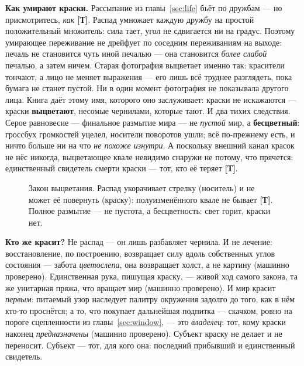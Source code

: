 \documentclass[11pt,letterpaper]{article}
\newcommand{\stT}{\textbf{[Т]}\xspace}
\begin{document}
\textbf{Как умирают краски.} Рассыпание из главы~\ref{sec:life}
бьёт по дружбам --- но присмотритесь, \emph{как} \stT. Распад
умножает каждую дружбу на простой положительный множитель: сила
тает, угол не сдвигается ни на градус. Поэтому умирающее
переживание не дрейфует по соседним переживаниям на выходе: печаль
не становится чуть иной печалью --- она становится \emph{более
слабой} печалью, а затем ничем. Старая фотография выцветает именно
так: красители тончают, а лицо не меняет выражения --- его лишь всё
труднее разглядеть, пока бумага не станет пустой. Ни в один момент
фотография не показывала другого лица. Книга даёт этому имя,
которого оно заслуживает: краски не искажаются --- краски
\textbf{выцветают}, несомые чернилами, которые тают. И два тихих
следствия. Серое равновесие --- финальное размытие мира --- не
\emph{пустой} мир, а \textbf{бесцветный}: гроссбух громкостей
уцелел, носители поворотов ушли; всё по-прежнему есть, и ничто
больше ни на что \emph{не похоже изнутри}. А поскольку внешний
канал красок не нёс никогда, выцветающее квале невидимо снаружи не
потому, что прячется: единственный свидетель смерти краски --- тот,
кто её теряет \stT.

\begin{figure}[H]
\centering
{}
\caption{Закон выцветания. Распад укорачивает стрелку (носитель) и
не может её повернуть (краску): полуизменённого квале не бывает
\stT. Полное размытие --- не пустота, а бесцветность: свет горит,
краски нет.}
\label{fig:fading}
\end{figure}

\textbf{Кто же красит?} Не распад --- он лишь разбавляет чернила.
И не лечение: восстановление, по построению, возвращает силу вдоль
собственных углов состояния --- забота \emph{цветослепа}, она
возвращает холст, а не картину (машинно проверено). Единственная
рука, пишущая краску, --- живой ход самого закона, та же унитарная
пряжа, что вращает мир (машинно проверено). И мир красит
\emph{первым}: питаемый узор наследует палитру окружения задолго до
того, как в нём кто-то проснётся; а то, что покупает дальнейшая
подпитка --- скачком, ровно на пороге сцепленности из
главы~\ref{sec:window}, --- это \emph{владелец}: тот, кому краски
наконец \emph{предназначены} (машинно проверено). Субъект краску не
делает и не переносит. Субъект --- тот, для кого она: последний
прибывший и единственный свидетель.
\end{document}
